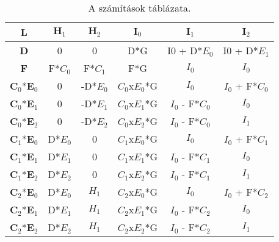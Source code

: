 \begin{table}[h]
\centering
\caption{A számítások táblázata.}
	\begin{tabular}{|c||c|c|c|c|c|}
		\hline
		\textbf{L}     & $\textbf{H}_1$   & $\textbf{H}_2$    & $\textbf{I}_0$      & $\textbf{I}_1$        & $\textbf{I}_2$        \\ \hline
		\textbf{D}     & 0    & 0     & D*G     & I0 + D*$E_0$ & I0 + D*$E_1$ \\ \hline
		\textbf{F}     & F*$C_0$ & F*$C_1$  & F*G     & $I_0$        & $I_0$        \\ \hline
		$\textbf{C}_0$*$\textbf{E}_0$ & 0    & -D*$E_0$ & $C_0$x$E_0$*G & $I_0$        & $I_0$ + F*$C_0$ \\ \hline
		$\textbf{C}_0$*$\textbf{E}_1$ & 0    & -D*$E_1$ & $C_0$x$E_1$*G & $I_0$ - F*$C_0$ & $I_0$        \\ \hline
		$\textbf{C}_0$*$\textbf{E}_2$ & 0    & -D*$E_2$ & $C_0$x$E_2$*G & $I_0$ - F*$C_0$ & $I_1$        \\ \hline
		$\textbf{C}_1$*$\textbf{E}_0$ & D*$E_0$ & 0     & $C_1$x$E_0$*G & $I_0$        & $I_0$ + F*$C_1$ \\ \hline
		$\textbf{C}_1$*$\textbf{E}_1$ & D*$E_1$ & 0     & $C_1$x$E_1$*G & $I_0$ - F*$C_1$ & $I_0$        \\ \hline
		$\textbf{C}_1$*$\textbf{E}_2$ & D*$E_2$ & 0     & $C_1$x$E_2$*G & $I_0$ - F*$C_1$ & $I_1$        \\ \hline
		$\textbf{C}_2$*$\textbf{E}_0$ & D*$E_0$ & $H_1$    & $C_2$x$E_0$*G & $I_0$        & $I_0$ + F*$C_2$ \\ \hline
		$\textbf{C}_2$*$\textbf{E}_1$ & D*$E_1$ & $H_1$    & $C_2$x$E_1$*G & $I_0$ - F*$C_2$ & $I_0$        \\ \hline
		$\textbf{C}_2$*$\textbf{E}_2$ & D*$E_2$ & $H_1$   & $C_2$x$E_2$*G & $I_0$ - F*$C_2$ & $I_1$        \\ \hline
	\end{tabular}
\end{table}
